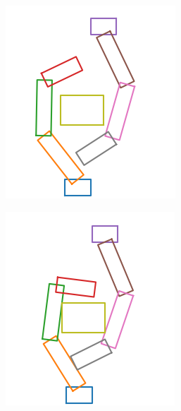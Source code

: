 \documentclass[a4paper,twoside,12pt,papersize, dvipdfmx]{iirthesis}
\begin{document}
\begin{figure}[b]
\centering
\begin{minipage}{0.33\hsize}
\includegraphics[width=0.9\hsize]{fig/3-new-planner/rec_before_FC.png}
\label{fig::planner::beforefc}
\end{minipage}\hfill
\begin{minipage}{0.33\hsize}
\includegraphics[width=0.9\hsize]{fig/3-new-planner/rec_FC_left_right.png}

\end{minipage}
\end{figure}
\end{document}
